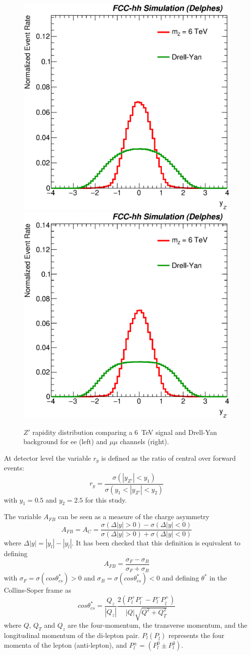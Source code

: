 \begin{figure}[!htb]
  \centering
  \includegraphics[width=0.45\columnwidth]{Fig/yzp_sel0_lin_norm_ee.eps}
  \includegraphics[width=0.45\columnwidth]{Fig/yzp_sel0_lin_norm_mumu.eps}
  \caption{$Z'$ rapidity distribution comparing a 6~TeV signal and Drell-Yan background for ee (left) and $\mu\mu$ channels (right).}
  \label{figure:lepana:yzp}
\end{figure}

At detector level the variable $r_y$ is defined as the ratio of central over forward events:
\begin{equation}
r_y = \frac{\sigma(|y_{Z'}| < y_1)}{\sigma(y_1 < |y_{Z'}| <y_2)}
\end{equation}
with $y_1=0.5$ and $y_2=2.5$ for this study.

The variable $A_{FB}$ can be seen as a measure of the charge asymmetry
\begin{equation}
A_{FB} = A_C =  \frac{\sigma(\Delta|y| > 0) - \sigma(\Delta|y| < 0)}{\sigma(\Delta|y| > 0) + \sigma(\Delta|y| < 0)}
\end{equation}
where $\Delta|y| = |y_l| - |y_{\bar{l}}|$. It has been checked that this definition is equivalent to defining 
\begin{equation}
A_{FB} =   \frac{\sigma_F - \sigma_B}{\sigma_F + \sigma_B}
\end{equation}
with $\sigma_F = \sigma (cos\theta^{*}_{cs})>0$ and $\sigma_B = \sigma (cos\theta^{*}_{cs})<0$ and defining $\theta^*$ in the Collins-Soper 
frame as
\begin{equation}
cos\theta^{*}_{cs} =  \frac{Q_z}{|Q_z|} \frac{2(P_l^+P_{\bar{l}}^- - P_l^-P_{\bar{l}}^+)}{|Q| \sqrt{Q^2+Q^2_T}}
\end{equation}
where $Q$, $Q_T$ and $Q_z$ are the four-momentum, the transverse momentum, and the longitudinal
momentum of the di-lepton pair. $P_{l}(P_{\bar{l}})$ represents the four momenta of the lepton (anti-lepton),
and $P^\pm_l = (P^0_l \pm P^3_l)$.


